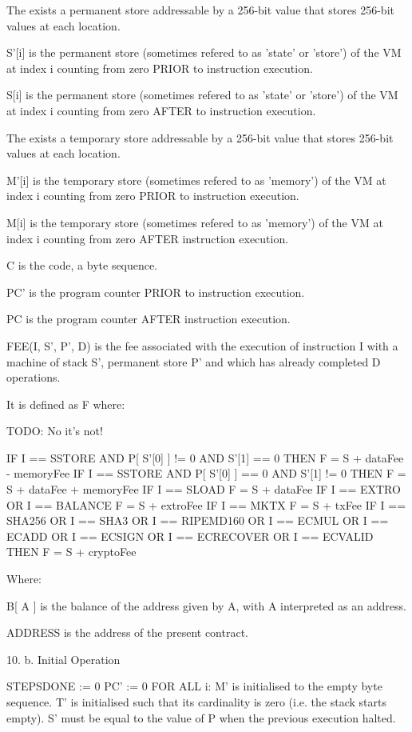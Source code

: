 \documentclass[9pt,oneside]{amsart}
\begin{document}
\begin{multicols}{2}
The exists a permanent store addressable by a 256-bit value that stores 256-bit values at each location.

S'[i] is the permanent store (sometimes refered to as 'state' or 'store') of the VM at index i counting from zero PRIOR to instruction execution.

S[i] is the permanent store (sometimes refered to as 'state' or 'store') of the VM at index i counting from zero AFTER to instruction execution.


The exists a temporary store addressable by a 256-bit value that stores 256-bit values at each location.

M'[i] is the temporary store (sometimes refered to as 'memory') of the VM at index i counting from zero PRIOR to instruction execution.

M[i] is the temporary store (sometimes refered to as 'memory') of the VM at index i counting from zero AFTER instruction execution.

C is the code, a byte sequence.

PC' is the program counter PRIOR to instruction execution.

PC is the program counter AFTER instruction execution.


FEE(I, S', P', D) is the fee associated with the execution of instruction I with a machine of stack S', permanent store P' and which has already completed D operations.

It is defined as F where:

TODO: No it's not!

IF I == SSTORE AND P[ S'[0] ] != 0 AND S'[1] == 0 THEN
    F = S + dataFee - memoryFee
IF I == SSTORE AND P[ S'[0] ] == 0 AND S'[1] != 0 THEN
    F = S + dataFee + memoryFee
IF I == SLOAD
    F = S + dataFee
IF I == EXTRO OR I == BALANCE
    F = S + extroFee
IF I == MKTX
    F = S + txFee
IF I == SHA256 OR I == SHA3 OR I == RIPEMD160 OR I == ECMUL OR I == ECADD
    OR I == ECSIGN OR I == ECRECOVER OR I == ECVALID THEN
    F = S + cryptoFee 

Where:

B[ A ] is the balance of the address given by A, with A interpreted as an address.

ADDRESS is the address of the present contract.


10. b. Initial Operation

STEPSDONE := 0
PC' := 0
FOR ALL i: M' is initialised to the empty byte sequence.
T' is initialised such that its cardinality is zero (i.e. the stack starts empty).
S' must be equal to the value of P when the previous execution halted.



\end{multicols}
\end{document}
